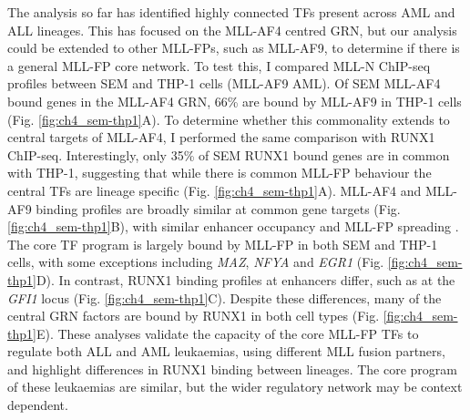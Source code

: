 The analysis so far has identified highly connected TFs present across AML and ALL lineages. This has focused on the MLL-AF4 centred GRN, but our analysis could be extended to other MLL-FPs, such as MLL-AF9, to determine if there is a general MLL-FP core network. To test this, I compared MLL-N ChIP-seq profiles between SEM and THP-1 cells (MLL-AF9 AML). Of SEM MLL-AF4 bound genes in the MLL-AF4 GRN, 66\% are bound by MLL-AF9 in THP-1 cells (Fig. \ref{fig:ch4_sem-thp1}A). To determine whether this commonality extends to central targets of MLL-AF4, I performed the same comparison with RUNX1 ChIP-seq. Interestingly, only 35\% of SEM RUNX1 bound genes are in common with THP-1, suggesting that while there is common MLL-FP behaviour the central TFs are lineage specific (Fig. \ref{fig:ch4_sem-thp1}A). MLL-AF4 and MLL-AF9 binding profiles are broadly similar at common gene targets (Fig. \ref{fig:ch4_sem-thp1}B), with similar enhancer occupancy and MLL-FP spreading \citep{kerry_mll-af4_2017}. The core TF program is largely bound by MLL-FP in both SEM and THP-1 cells, with some exceptions including \textit{MAZ}, \textit{NFYA} and \textit{EGR1} (Fig. \ref{fig:ch4_sem-thp1}D). In contrast, RUNX1 binding profiles at enhancers differ, such as at the \textit{GFI1} locus (Fig. \ref{fig:ch4_sem-thp1}C). Despite these differences, many of the central GRN factors are bound by RUNX1 in both cell types (Fig. \ref{fig:ch4_sem-thp1}E). These analyses validate the capacity of the core MLL-FP TFs to regulate both ALL and AML leukaemias, using different MLL fusion partners, and highlight differences in RUNX1 binding between lineages. The core program of these leukaemias are similar, but the wider regulatory network may be context dependent.

